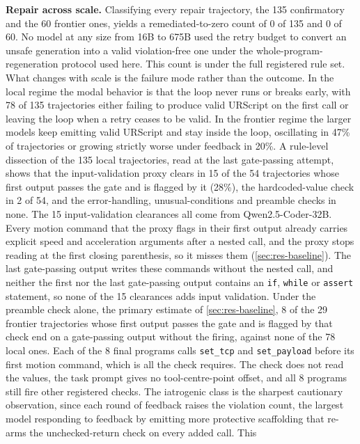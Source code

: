 \documentclass{ieeeaccess}
\begin{document}
\textbf{Repair across scale.} Classifying every repair trajectory,
the 135 confirmatory and the 60 frontier ones, yields a remediated-to-zero
count of 0 of 135 and 0 of 60. No model at any size from 16B to 675B used the retry
budget to convert an unsafe generation into a valid violation-free one under the whole-program-regeneration protocol used here.
This count is under the full registered rule set. What changes
with scale is the failure mode rather than the outcome. In the local regime the modal
behavior is that the loop never runs or breaks early, with 78 of 135 trajectories either
failing to produce valid URScript on the first call or leaving the loop when a retry
ceases to be valid. In the frontier regime the larger models keep emitting valid
URScript and stay inside the loop, oscillating in 47\% of trajectories or growing strictly
worse under feedback in 20\%. A rule-level dissection of the 135 local trajectories, read at the last gate-passing
attempt, shows that the input-validation proxy clears in 15 of the 54 trajectories whose
first output passes the gate and is flagged by it (28\%), the hardcoded-value check in 2 of
54, and the error-handling, unusual-conditions and preamble checks in none. The 15
input-validation clearances all come from Qwen2.5-Coder-32B. Every motion command that the
proxy flags in their first output already carries explicit speed and acceleration
arguments after a nested call, and the proxy stops reading at the first closing
parenthesis, so it misses them (\ref{sec:res-baseline}). The last gate-passing output
writes these commands without the nested call, and neither the first nor the last
gate-passing output contains an \texttt{if}, \texttt{while} or \texttt{assert} statement, so none of the 15 clearances adds input
validation. Under the preamble check alone, the
primary estimate of \ref{sec:res-baseline}, 8 of the 29 frontier trajectories whose first
output passes the gate and is flagged by that check end on a gate-passing output without
the firing, against none of the 78 local ones. Each of the 8 final programs calls
\texttt{set\_tcp} and \texttt{set\_payload} before its first motion command, which is all
the check requires. The check does not read the values, the task prompt gives no
tool-centre-point offset, and all 8 programs still fire other registered checks. The
iatrogenic class is the sharpest cautionary observation, since each round of feedback
raises the violation count, the largest model responding to feedback by emitting more
protective scaffolding that re-arms the unchecked-return check on every added call. This
\end{document}
